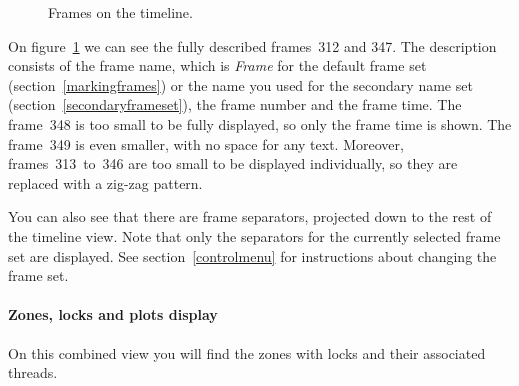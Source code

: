 \documentclass[hidelinks,titlepage,a4paper]{article}
\begin{document}
\begin{figure}[h]
\centering{}
\caption{Frames on the timeline.}
\label{framesets}
\end{figure}

On figure~\ref{framesets} we can see the fully described frames~312 and 347. The description consists of the frame name, which is \emph{Frame} for the default frame set (section~\ref{markingframes}) or the name you used for the secondary name set (section~\ref{secondaryframeset}), the frame number and the frame time. The frame~348 is too small to be fully displayed, so only the frame time is shown. The frame~349 is even smaller, with no space for any text. Moreover, frames~313~to~346 are too small to be displayed individually, so they are replaced with a zig-zag pattern.

You can also see that there are frame separators, projected down to the rest of the timeline view. Note that only the separators for the currently selected frame set are displayed. See section~\ref{controlmenu} for instructions about changing the frame set.

\paragraph{Zones, locks and plots display}
\label{zoneslocksplots}

On this combined view you will find the zones with locks and their associated threads.
\end{document}
